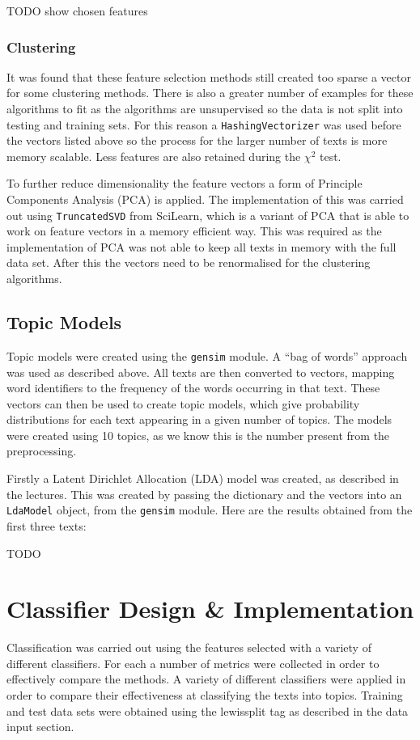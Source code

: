 \documentclass{article}
\begin{document}
TODO show chosen features

\subsubsection{Clustering}
It was found that these feature selection methods still created too sparse a vector for some clustering methods. There is also a greater number of examples for these algorithms to fit as the algorithms are unsupervised so the data is not split into testing and training sets. For this reason a \verb|HashingVectorizer| was used before the vectors listed above so the process for the larger number of texts is more memory scalable. Less features are also retained during the $\chi^2$ test.

To further reduce dimensionality the feature vectors a form of Principle Components Analysis (PCA) is applied. The implementation of this was carried out using \verb|TruncatedSVD| from SciLearn, which is a variant of PCA that is able to work on feature vectors in a memory efficient way. This was required as the implementation of PCA was not able to keep all texts in memory with the full data set. After this the vectors need to be renormalised for the clustering algorithms. 

\subsection{Topic Models}
Topic models were created using the \verb|gensim| module. A ``bag of words'' approach was used as described above. All texts are then converted to vectors, mapping word identifiers to the frequency of the words occurring in that text. These vectors can then be used to create topic models, which give probability distributions for each text appearing in a given number of topics. The models were created using 10 topics, as we know this is the number present from the preprocessing.

Firstly a Latent Dirichlet Allocation (LDA) model was created, as described in the lectures. This was created by passing the dictionary and the vectors into an \verb|LdaModel| object, from the \verb|gensim| module. Here are the results obtained from the first three texts:

TODO

\section{Classifier Design \& Implementation}
Classification was carried out using the features selected with a variety of different classifiers. For each a number of metrics were collected in order to effectively compare the methods. A variety of different classifiers were applied in order to compare their effectiveness at classifying the texts into topics. Training and test data sets were obtained using the lewissplit tag as described in the data input section.
\end{document}
